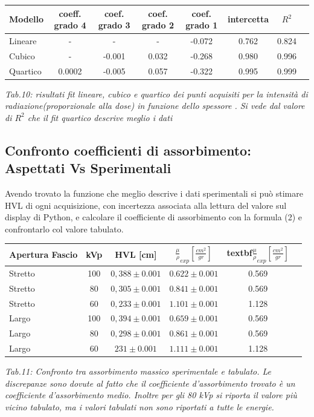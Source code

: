\documentclass[a4paper]{article}
\begin{document}
\begin{center} 
		
		\begin{tabular}{lccccccc}
			\hline
			\hline
			\textbf{Modello}	& \textbf{coeff. grado 4}&\textbf{coef. grado 3}&\textbf{coef. grado 2}& \textbf{coef. grado 1}& \textbf{intercetta}&  \textbf{$R^{2}$} 	 \\
			\hline
			\hline
			Lineare	&-&-&-&-0.072&0.762&0.824	\\
			Cubico	&-&-0.001&0.032&-0.268&0.980&0.996\\
			Quartico &0.0002&-0.005&0.057&-0.322&0.995&0.999\\
			
			\hline
			\hline
		\end{tabular}
		\linebreak
		\emph{Tab.10: risultati fit lineare, cubico e quartico  dei punti acquisiti per la intensità di radiazione(proporzionale alla dose) in funzione dello spessore . Si vede dal valore di $R^{2}$ che il fit quartico descrive meglio i dati} 
	\end{center} 
\subsection{Confronto coefficienti di assorbimento: Aspettati Vs Sperimentali }
Avendo trovato la funzione che meglio descrive i dati sperimentali si può stimare HVL di ogni acquisizione, con incertezza associata alla lettura del valore sul display di Python, e calcolare il coefficiente di assorbimento con la formula (2) e confrontarlo col valore tabulato.
\begin{center} 
		
		\begin{tabular}{lccccc}
			\hline
			\hline
			\textbf{Apertura Fascio} &\textbf{kVp}	& \textbf{HVL [cm]}&\textbf{$\frac{\mu}{\rho}_{exp}[\frac{cm^{2}}{gr}]$}&textbf{$\frac{\mu}{\rho}_{exp}[\frac{cm^{2}}{gr}]$} 	 \\
			\hline
			\hline
			Stretto	& 100 &	$0,388 \pm 0.001$ &$0.622 \pm 0.001$&0.569 \\
			Stretto	& 80 &	$0,305 \pm 0.001$ &$0.841 \pm 0.001$&0.569 \\
			Stretto	& 60 &	$0,233 \pm 0.001$ &$1.101 \pm 0.001$&1.128 \\
			Largo	& 100 &	$0,394 \pm 0.001$ &$0.659 \pm 0.001$&0.569 \\
			Largo	& 80 &	$0,298 \pm 0.001$ &$0.861 \pm 0.001$&0.569 \\
			Largo	& 60 &	$231 \pm 0.001$ &$1.111 \pm 0.001$&1.128 \\
			
			
			\hline
			\hline
		\end{tabular}
		\linebreak
		\emph{Tab.11: Confronto tra assorbimento massico sperimentale e tabulato. Le discrepanze sono dovute al fatto che il coefficiente d'assorbimento trovato è un coefficiente d'assorbimento medio. Inoltre per gli 80 kVp si riporta il valore più vicino tabulato, ma i valori tabulati non sono riportati a tutte le energie.} 
\end{center}
\end{document}
